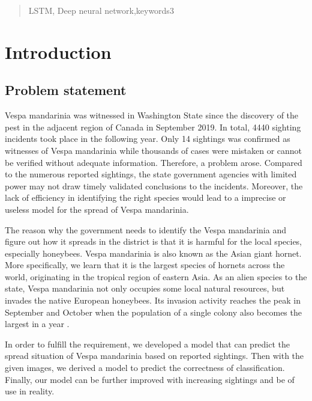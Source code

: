 \documentclass{mcmthesis}
\begin{document}
\begin{abstract}
	\begin{keywords}
	LSTM, Deep neural network,keywords3
	\end{keywords}
\end{abstract}

\maketitle

\tableofcontents
\newpage

\section{Introduction}

\subsection{Problem statement}
Vespa mandarinia was witnessed in Washington State since the discovery of the pest in the adjacent region of Canada in September 2019. In total, 4440 sighting incidents took place in the following year. Only 14 sightings was confirmed as witnesses of Vespa mandarinia while thousands of cases were mistaken or cannot be verified without adequate information. Therefore, a problem arose. Compared to the numerous reported sightings, the state government agencies with limited power may not draw timely validated conclusions to the incidents. Moreover, the lack of efficiency in identifying the right species would lead to a imprecise or useless model for the spread of Vespa mandarinia.

The reason why the government needs to identify the Vespa mandarinia and figure out how it spreads in the district is that it is harmful for the local species, especially honeybees. Vespa mandarinia is also known as the Asian giant hornet. More specifically, we learn that it is the largest species of hornets across the world, originating in the tropical region of eastern Asia. As an alien species to the state, Vespa mandarinia not only occupies some local natural resources, but invades the native European honeybees. Its invasion activity reaches the peak in September and October when the population of a single colony also becomes the largest in a year \cite{AGH}.

In order to fulfill the requirement, we developed a model that can predict the spread situation of Vespa mandarinia based on reported sightings. Then with the given images, we derived a model to predict the correctness of classification. Finally, our model can be further improved with increasing sightings and be of use in reality.
\end{document}
